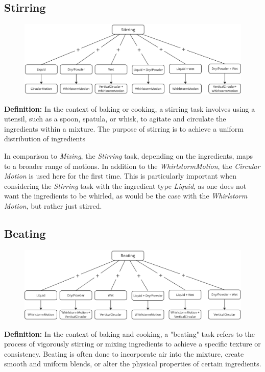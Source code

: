 \subsection{Stirring}
\begin{figure}[H]
    \includegraphics[scale=0.18]{Graphics/StirringDeisionTree.jpg}
    \end{figure}
\textbf{Definition:}
In the context of baking or cooking, a stirring task involves using a utensil, such as a spoon, spatula, or whisk, to agitate and circulate the ingredients within a mixture. The purpose of stirring is to achieve a uniform distribution of ingredients

In comparison to \textit{Mixing}, the \textit{Stirring} task, depending on the ingredients, maps to a broader range of motions. In addition to the \textit{WhirlstormMotion}, the \textit{Circular Motion} is used here for the first time. This is particularly important when considering the \textit{Stirring} task with the ingredient type \textit{Liquid}, as one does not want the ingredients to be whirled, as would be the case with the \textit{Whirlstorm Motion}, but rather just stirred.
\subsection{Beating}
\begin{figure}[H]
    \includegraphics[scale=0.18]{Graphics/BeatingDecisionTree.jpg}
    \end{figure}
\textbf{Definition:}
In the context of baking and cooking, a "beating" task refers to the process of vigorously stirring or mixing ingredients to achieve a specific texture or consistency. Beating is often done to incorporate air into the mixture, create smooth and uniform blends, or alter the physical properties of certain ingredients.

